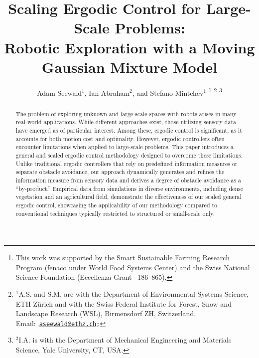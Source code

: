\documentclass[letterpaper,10pt,conference,twoside]{IEEEtran}
\theoremstyle{definition}
\begin{document}

\title{\LARGE\bf Scaling Ergodic Control for Large-Scale Problems:\\Robotic Exploration with a Moving Gaussian Mixture Model}

\author{Adam Seewald${}^{\text{1}}$, Ian Abraham${}^{\text{2}}$, and Stefano Mintchev${}^{\text{1}}$
  \thanks{%
  This work was supported by the Smart Sustainable Farming Research Program (fenaco under World Food Systems Center) and the Swiss National Science Foundation (Eccellenza Grant \textnumero~186~865).}
  \thanks{${}^{\text{1}}$A.\hspace*{.4ex}S. and S.\hspace*{.4ex}M. are with the Department of Environmental Systems Science, ETH Z{\"u}rich and with the Swiss Federal Institute for Forest, Snow and Landscape Research (WSL), Birmensdorf ZH, Switzerland. Email:~{\tt\footnotesize \href{mailto:aseewald@ethz.ch}{aseewald@ethz.ch};}}
  \thanks{${}^{\text{2}}$I.\hspace*{.4ex}A. is with the Department of Mechanical Engineering and Materials Science, Yale University, CT, USA.}
}

\maketitle

\begin{abstract}
  The problem of exploring unknown and large-scale spaces with robots arises in many real-world applications. While different approaches exist, those utilizing sensory data have emerged as of particular interest. Among these, ergodic control is significant, as it accounts for both motion cost and optimality. However, ergodic controllers often encounter limitations when applied to large-scale problems. This paper introduces a general and scaled ergodic control methodology designed to overcome these limitations. Unlike traditional ergodic controllers that rely on predefined information measures or separate obstacle avoidance, our approach dynamically generates and refines the information measure from sensory data and derives a degree of obstacle avoidance as a ``by-product.'' Empirical data from simulations in diverse environments, including dense vegetation and an agricultural field, demonstrate the effectiveness of our scaled general ergodic control, showcasing the applicability of our methodology compared to conventional techniques typically restricted to structured or small-scale only.
\end{abstract}
\end{document}
